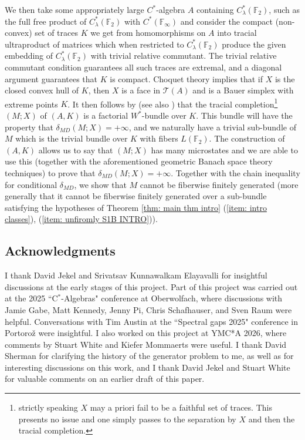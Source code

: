 \documentclass[10pt]{amsart}
\theoremstyle{definition}
\numberwithin{equation}{section}
\newcommand{\bF}{{\mathbb F}}
\newcommand{\cT}{{\mathcal T}}
\begin{document}
 We then take some appropriately large $C^{*}$-algebra $A$ containing $C^{*}_{\lambda}(\bF_{2})$, such as the full free product of $C^{*}_{\lambda}(\bF_{2})$ with $C^{*}(\bF_{\infty})$ and consider the compact (non-convex) set of traces $K$ we get from homomorphisms on $A$ into tracial ultraproduct of matrices which when restricted to $C^{*}_{\lambda}(\bF_{2})$ produce the given embedding of $C^{*}_{\lambda}(\bF_{2})$ with trivial relative commutant. The trivial relative commutant condition guarantees all such traces are extremal, and a diagonal argument guarantees that $K$ is compact. Choquet theory implies that if $X$ is the closed convex hull of $K$, then $X$ is a face in $\cT(A)$ and is a Bauer simplex with extreme points $K$. It then follows by \cite[Theorem 3]{OzawaBundle} (see also \cite[Theorem 3.37]{TraciallyComplete}) that the tracial completion\footnote{strictly speaking $X$ may a priori fail to be a faithful set of traces. This presents no issue and one simply passes to the separation by $X$ and then the tracial completion.} $(M;X)$ of $(A,K)$ is a factorial $W^{*}$-bundle over $K$. This bundle will have the property that $\delta_{MD}(M;X)=+\infty$, and we naturally have a trivial sub-bundle of $M$ which is the trivial bundle over $K$ with fibers $L(\bF_{2})$. The construction of $(A,K)$ allows us to say that $(M;X)$ has many microstates and we are able to use this (together with the aforementioned geometric Banach space theory techniques) to prove that $\delta_{MD}(M;X)=+\infty$. Together with the chain inequality for conditional $\delta_{MD}$, we show that $M$ cannot be fiberwise finitely generated (more generally that it cannot be fiberwise finitely generated over a sub-bundle satisfying the hypotheses of Theorem \ref{thm: main thm intro} (\ref{item: intro classes}), (\ref{item: unfiromly S1B INTRO})). 



\subsection*{Acknowledgments} I thank David Jekel and Srivatsav Kunnawalkam Elayavalli for insightful discussions at the early stages of this project. 
Part of this project was carried out at the 2025 ``C$^{*}$-Algebras" conference at Oberwolfach, where discussions with 
Jamie Gabe, Matt Kennedy, Jenny Pi, Chris Schafhauser, and Sven Raum were helpful. Conversations with Tim Austin at the ``Spectral gaps 2025" conference in Portoro\v{z} were insightful.
I also worked on this project at YMC*A 2026, where comments by Stuart White and Kiefer Mommaerts were useful. 
I thank David Sherman for clarifying the history of the generator problem to me, as well as for interesting discussions on this work, and I thank David Jekel and Stuart White for valuable comments on an earlier draft of this paper. 
\end{document}
